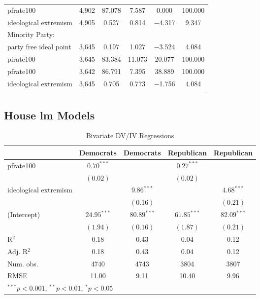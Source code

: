 \documentclass[12pt]{article}
\begin{document}
\begin{table}[!htbp]
\begin{tabular}{@{\extracolsep{5pt}}lccccc}
		pfrate100 & 4,902 & 87.078 & 7.587 & 0.000 & 100.000 \\ 
		ideological extremism & 4,905 & 0.527 & 0.814 & $-$4.317 & 9.347 \\ 
		\hline
		Minority Party: & & & & & \\
		\hline
		party free ideal point & 3,645 & 0.197 & 1.027 & $-$3.524 & 4.084 \\ 
		pirate100 & 3,645 & 83.384 & 11.073 & 20.077 & 100.000 \\ 
		pfrate100 & 3,642 & 86.791 & 7.395 & 38.889 & 100.000 \\ 
		ideological extremism & 3,645 & 0.705 & 0.773 & $-$1.756 & 4.084 \\ 
		\hline \\[-1.8ex] 
	\end{tabular} 
\end{table} 

\pagebreak

\subsection{House lm Models}


\begin{table}[!htb]
	\begin{center}
		\caption{Bivariate DV/IV Regressions}
		\begin{tabular}{l c c c c }
			\hline
			& Democrats & Democrats & Republican & Republican \\
			\hline
			pfrate100              & $0.70^{***}$  &               & $0.27^{***}$  &               \\
			& $(0.02)$      &               & $(0.02)$      &               \\
			ideological extremism &               & $9.86^{***}$  &               & $4.68^{***}$  \\
			&               & $(0.16)$      &               & $(0.21)$      \\
			(Intercept)            & $24.95^{***}$ & $80.89^{***}$ & $61.85^{***}$ & $82.09^{***}$ \\
			& $(1.94)$      & $(0.16)$      & $(1.87)$      & $(0.21)$      \\
			\hline
			R$^2$                  & 0.18          & 0.43          & 0.04          & 0.12          \\
			Adj. R$^2$             & 0.18          & 0.43          & 0.04          & 0.12          \\
			Num. obs.              & 4740          & 4743          & 3804          & 3807          \\
			RMSE                   & 11.00         & 9.11          & 10.40         & 9.96          \\
			\hline
			\multicolumn{5}{l}{\scriptsize{$^{***}p<0.001$, $^{**}p<0.01$, $^*p<0.05$}}
		\end{tabular}
	\end{center}
\end{table}
\end{document}
